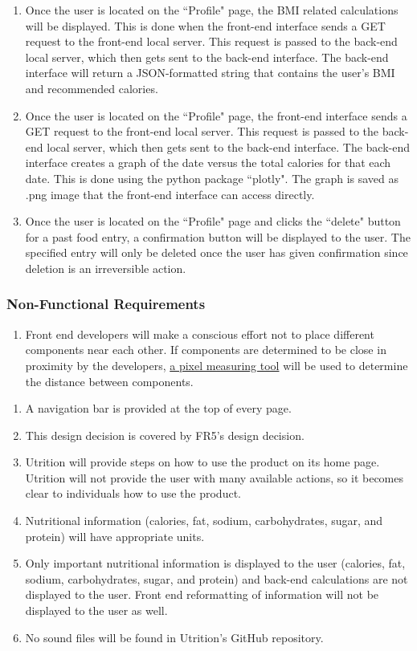 \documentclass[12pt, titlepage]{article}
\begin{document}
\begin{enumerate}[{FR}1. ]
	\item Once the user is located on the ``Profile" page, the BMI related calculations will be displayed. This is done when the front-end interface sends a GET request to the front-end local server. This request is passed to the back-end local server, which then gets sent to the back-end interface. The back-end interface will return a JSON-formatted string that contains the user's BMI and recommended calories.
	\item Once the user is located on the ``Profile" page, the front-end interface sends a GET request to the front-end local server. This request is passed to the back-end local server, which then gets sent to the back-end interface. The back-end interface creates a graph of the date versus the total calories for that each date. This is done using the python package ``plotly". The graph is saved as .png image that the front-end interface can access directly.
	\item Once the user is located on the ``Profile" page and clicks the ``delete" button for a past food entry, a confirmation button will be displayed to the user. The specified entry will only be deleted once the user has given confirmation since deletion is an irreversible action. 
\end{enumerate}

\subsubsection{Non-Functional Requirements}
\begin{enumerate}[{LF}1. ]
	\item Front end developers will make a conscious effort not to place different components near each other. If components are determined to be close in proximity by the developers, \href{https://www.rapidtables.com/web/tools/pixel-ruler.html}{a pixel measuring tool} will be used to determine the distance between components.
\end{enumerate}

\begin{enumerate}[{UH}1. ]
	\item A navigation bar is provided at the top of every page.
	\item This design decision is covered by FR5's design decision.
	\item Utrition will provide steps on how to use the product on its home page. Utrition will not provide the user with many available actions, so it becomes clear to individuals how to use the product. 
	\item Nutritional information (calories, fat, sodium, carbohydrates, sugar, and protein) will have appropriate units.
	\item Only important nutritional information is displayed to the user (calories, fat, sodium, carbohydrates, sugar, and protein) and back-end calculations are not displayed to the user. Front end reformatting of information will not be displayed to the user as well.
	\item No sound files will be found in Utrition's GitHub repository.
\end{enumerate}
\end{document}
